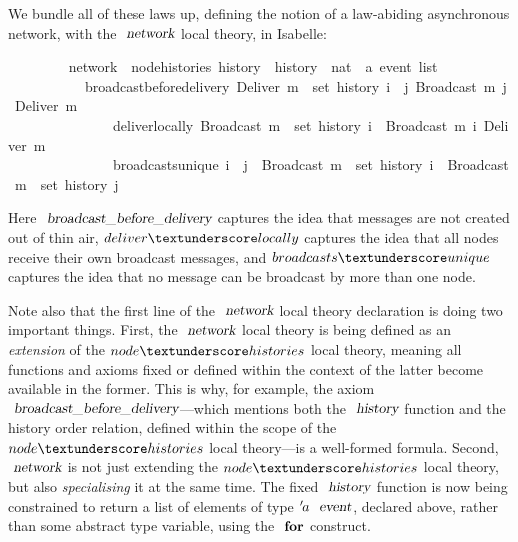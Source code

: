 \documentclass[acmlarge,review,anonymous]{acmart}\settopmatter{printfolios=true}
\begin{document}
We bundle all of these laws up, defining the notion of a law-abiding asynchronous network, with the $\isa{network}$ local theory, in Isabelle:
\\
\begin{isabellebody}
\ \ \ \ \ \ \ \  network\ {\isacharequal}\ node{\isacharunderscore}histories\ history\ \ history\ {\isacharcolon}{\isacharcolon}\ {\isachardoublequoteopen}nat\ {\isasymRightarrow}\ {\isacharprime}a\ event\ list{\isachardoublequoteclose}\ {\isacharplus}\isanewline
\ \ \ \ \ \ \ \ \ \ \ broadcast{\isacharunderscore}before{\isacharunderscore}delivery{\isacharcolon}\ {\isachardoublequoteopen}Deliver\ m\ {\isasymin}\ set\ {\isacharparenleft}history\ i{\isacharparenright}\ {\isasymLongrightarrow}\ {\isasymexists}j{\isachardot}\ Broadcast\ m\ {\isasymsqsubset}\isactrlsup j\ Deliver\ m{\isachardoublequoteclose}\isanewline
\ \ \ \ \ \ \ \ \ \ \ \ \ \ \ deliver{\isacharunderscore}locally{\isacharcolon}\ {\isachardoublequoteopen}Broadcast\ m\ {\isasymin}\ set\ {\isacharparenleft}history\ i{\isacharparenright}\ {\isasymLongrightarrow}\ Broadcast\ m\ {\isasymsqsubset}\isactrlsup i\ Deliver\ m{\isachardoublequoteclose}\isanewline
\ \ \ \ \ \ \ \ \ \ \ \ \ \ \ broadcasts{\isacharunderscore}unique{\isacharcolon}\ {\isachardoublequoteopen}i\ {\isasymnoteq}\ j\ {\isasymLongrightarrow}\ Broadcast\ m\ {\isasymin}\ set\ {\isacharparenleft}history\ i{\isacharparenright}\ {\isasymLongrightarrow}\ Broadcast\ m\ {\isasymnotin}\ set\ {\isacharparenleft}history\ j{\isacharparenright}{\isachardoublequoteclose}
\end{isabellebody}
\vspace{\baselineskip}
Here $\isa{broadcast{\isacharunderscore}before{\isacharunderscore}delivery}$ captures the idea that messages are not created out of thin air, $deliver{\isacharunderscore}locally$ captures the idea that all nodes receive their own broadcast messages, and $broadcasts{\isacharunderscore}unique$ captures the idea that no message can be broadcast by more than one node.

Note also that the first line of the $\isa{network}$ local theory declaration is doing two important things.
First, the $\isa{network}$ local theory is being defined as an \emph{extension} of the $node{\isacharunderscore}histories$ local theory, meaning all functions and axioms fixed or defined within the context of the latter become available in the former.
This is why, for example, the axiom $\isa{broadcast{\isacharunderscore}before{\isacharunderscore}delivery}$---which mentions both the $\isa{history}$ function and the history order relation, defined within the scope of the $node{\isacharunderscore}histories$ local theory---is a well-formed formula.
Second, $\isa{network}$ is not just extending the $node{\isacharunderscore}histories$ local theory, but also \emph{specialising} it at the same time.
The fixed $\isa{history}$ function is now being constrained to return a list of elements of type ${\isacharprime}a\ \isa{event}$, declared above, rather than some abstract type variable, using the $\isacommand{for}$ construct.
\end{document}
